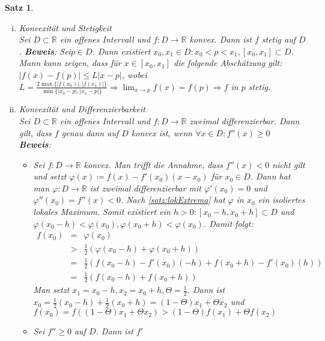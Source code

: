 \documentclass[ngerman,titlepage,twoside, parskip=half*]{scrreprt}
\newcommand*{\R}{\mathbb{R}}
\theoremstyle{plain}
\newtheorem{theorem}{Satz}[section]
\theoremstyle{definition}
\theoremstyle{remark}
\begin{document}
\begin{theorem}
  \begin{enumerate}[(i)]
    \item \textit{Konvexität und Stetigkeit}\\
      Sei $D\subset\R$ ein offenes Intervall und $f\colon D\rightarrow\R$
      konvex. Dann ist $f$ stetig auf $D$.
      \textbf{Beweis}: Sei$p\in D$. Dann existiert $x_0,x_1\in D\colon
      x_0<p<x_1, [x_0,x_1]\subset D$. Mann kann zeigen, dass für
      $x\in[x_0,x_1]$ die folgende Abschätzung gilt:\\
      $|f(x)-f(p)|\leq L|x-p|$, wobei $L=
      \frac{2\max\{|f(x_0)|,|f(x_1)|\}}{\min\{|x_0-p|,|x_1-p|\}}
      \Rightarrow\lim_{x\rightarrow p} f(x)=f(p)\Rightarrow f$ in $p$
      stetig.
    \item \textit{Konvexität und Differenzierbarkeit}\\
      Sei $D\subset\R$ ein offenes Intervall und $f\colon D\rightarrow\R$
      zweimal differenzierbar. Dann gilt, dass $f$ genau dann auf $D$
      konvex ist, wenn $\forall x\in D\colon f''(x)\geq 0$\\
      \textbf{Beweis}: \begin{itemize}
	\item["`$\Rightarrow$"'] Sei $f\colon D\rightarrow\R$ konvex. Man
	  trifft die Annahme, dass $f''(x)<0$ \emph{nicht} gilt und
	  setzt $\varphi(x)\coloneqq f(x)-f'(x_0)(x-x_0)$ für $x_0\in D$. Dann
	  hat man $\varphi\colon D\rightarrow\R$ ist zweimal differenzierbar
	  mit $\varphi'(x_0)=0$ und $\varphi''(x_0)=f''(x)<0$. Nach
	  \autoref{satz:lokExtrema} hat $\varphi$ in $x_0$ ein
	  isoliertes lokales Maximum. Somit existiert ein $h>0\colon
	  [x_0-h,x_0+h]\subset D$ und $\varphi(x_0-h)<\varphi(x_0),
	  \varphi(x_0+h)<\varphi(x_0)$. Damit folgt:
	  \begin{align*}
	    f(x_0)&=& \varphi(x_0)\\
	    &>& \frac{1}{2}(\varphi(x_0-h)+\varphi(x_0+h))\\
	    &=& \frac{1}{2}(f(x_0-h)-f'(x_0)(-h)+f(x_0+h)-f'(x_0)(h))\\
	    &=& \frac{1}{2}(f(x_0-h)+f(x_0+h))
	  \end{align*}
	  Man setzt $x_1=x_0-h, x_2=x_0+h, \Theta=\frac{1}{2}$. Dann ist
	  $x_0=\frac{1}{2}(x_0-h)+\frac{1}{2}(x_0+h)=(1-\Theta)x_1+
	  \Theta x_2$ und $f(x_0)=f( (1-\Theta)x_1+\Theta x_2)>(1-\Theta)
	  f(x_1)+\Theta f(x_2)$\textnormal{\lightning}
	\item["`$\Leftarrow$"'] Sei $f''\geq 0$ auf $D$. Dann ist $f'$

\end{itemize}
\end{enumerate}
\end{theorem}
\end{document}
